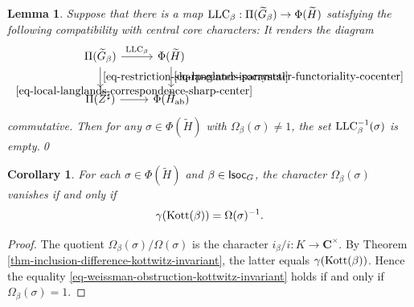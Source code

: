 \documentclass[10pt,english,reqno]{amsart}
\newcommand{\complexes}{\mathbf C}
\newcommand{\Isoc}{\textnormal{\textsf{Isoc}}}
\newcommand{\Kottwitz}{\textnormal{Kott}}
\newcommand{\abelian}{\textnormal{ab}}
\newcommand{\LLC}{\textnormal{LLC}}
\newtheorem{lem}[subsubsection]{Lemma}
\newtheorem{cor}[subsubsection]{Corollary}
\theoremstyle{definition}
\numberwithin{equation}{section}
\begin{document}
\begin{lem}
\label{lem-weissman-obstruction-isocrystal}
Suppose that there is a map $\LLC_{\beta} : \Pi(\widetilde G_{\beta}) \rightarrow \Phi(\widetilde H)$ satisfying the following compatibility with central core characters: It renders the diagram
\begin{equation}
\label{eq-local-langlands-compatibility-with-central-character-isocrystal}
\begin{tikzcd}
	\Pi(\widetilde G_{\beta}) \ar[r, "\LLC_{\beta}"]\ar[d, "\eqref{eq-restriction-sharp-center-isocrystal}"] & \Phi(\widetilde H) \ar[d, "\eqref{eq-langlands-parameter-functoriality-cocenter}"] \\
	\Pi(\widetilde Z^{\sharp}) \ar[r, "\eqref{eq-local-langlands-correspondence-sharp-center}"] & \Phi(\widetilde H_{\abelian})
\end{tikzcd}
\end{equation}
commutative. Then for any $\sigma \in \Phi(\widetilde H)$ with $\Omega_{\beta}(\sigma)\neq 1$, the set $\LLC_{\beta}^{-1}(\sigma)$ is empty.\qed
\end{lem}


\begin{cor}
\label{cor-weissman-obstruction-kottwitz-invariant}
For each $\sigma \in \Phi(\widetilde H)$ and $\beta \in \Isoc_G$, the character $\Omega_{\beta}(\sigma)$ vanishes if and only if
\begin{equation}
\label{eq-weissman-obstruction-kottwitz-invariant}
\gamma(\Kottwitz(\beta)) = \Omega(\sigma)^{-1}.
\end{equation}
\end{cor}
\begin{proof}
The quotient $\Omega_{\beta}(\sigma)/\Omega(\sigma)$ is the character $i_{\beta}/i : K \rightarrow \complexes^{\times}$. By Theorem \ref{thm-inclusion-difference-kottwitz-invariant}, the latter equals $\gamma(\Kottwitz(\beta))$. Hence the equality \eqref{eq-weissman-obstruction-kottwitz-invariant} holds if and only if $\Omega_{\beta}(\sigma) = 1$.
\end{proof}

\end{document}
